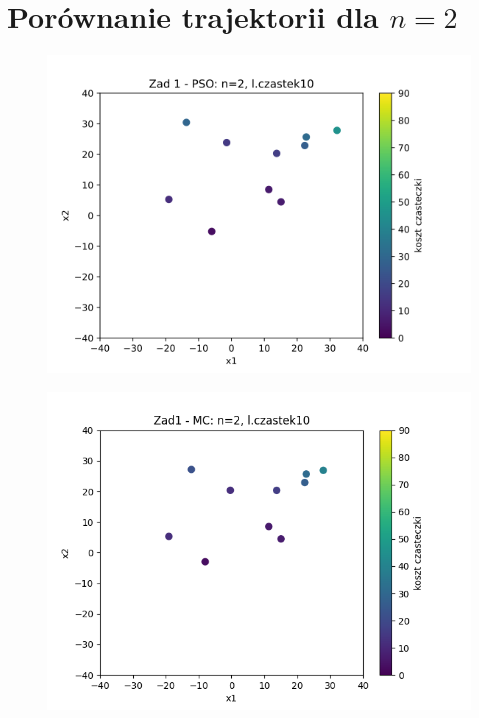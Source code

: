 \documentclass[11pt, a4paper, oneside]{article}
\begin{document}
\section{Porównanie trajektorii dla $n = 2$}

\begin{figure}[H]
\centering
\begin{minipage}[b]{\dimexpr.5\textwidth-1em}
  \centering
  \includegraphics[width=1\linewidth]{grafiki/Wykresy2d/PSO_zad1_startPositions.png}
  \label{fig:pozycjeStartowe:PSO1}
\end{minipage} \hfill
\begin{minipage}[b]{\dimexpr.5\textwidth-1em}
  \centering
  \includegraphics[width=1\linewidth]{grafiki/Wykresy2d/MC_Zad1_startPositions.png}
  \label{fig:pozycjeStartowe:MC1}
\end{minipage}
\end{figure}
\end{document}
